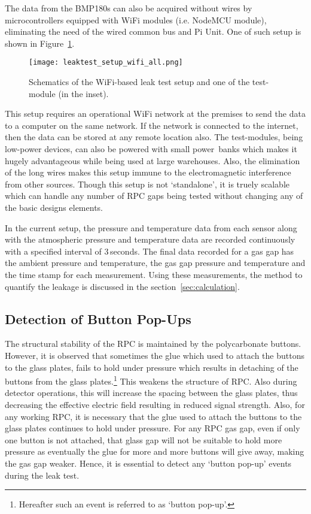 The data from the BMP180s can also be acquired without wires by microcontrollers equipped with WiFi modules (i.e. NodeMCU module\cite{nodemcu2015}), eliminating the need of the wired common bus and Pi Unit. One of such setup is shown in Figure~\ref{fig:leakwifi}. 
\begin{figure}
  \centering
  \texttt{[image: leaktest\_setup\_wifi\_all.png]}
  \caption{Schematics of the WiFi-based leak test setup and one of the test-module (in the inset).}
  \label{fig:leakwifi}
\end{figure}
This setup requires an operational WiFi network at the premises to send the data to a computer on the same network. If the network is connected to the internet, then the data can be stored at any remote location also. The test-modules, being low-power devices, can also be powered with small power~banks which makes it hugely advantageous while being used at large warehouses. Also, the elimination of the long wires makes this setup immune to the electromagnetic interference from other sources. Though this setup is not `standalone', it is truely scalable which can handle any number of RPC gaps being tested without changing any of the basic designs elements.

In the current setup, the pressure and temperature data from each sensor along with the atmospheric pressure and temperature data are recorded continuously with a specified interval of $3$\,seconds. The final data recorded for a gas gap has the ambient pressure and temperature, the gas gap pressure and temperature and the time stamp for each measurement. Using these measurements, the method to quantify the leakage is discussed in the section~\ref{sec:calculation}.

\subsection{Detection of Button Pop-Ups}\label{sec:button}
The structural stability of the RPC is maintained by the polycarbonate buttons. However, it is observed that sometimes the glue which used to attach the buttons to the glass plates, fails to hold under pressure which results in detaching of the buttons from the glass plates.\footnote{Hereafter such an event is referred to as `button pop-up'.} This weakens the structure of RPC. Also during detector operations, this will increase the spacing between the glass plates, thus decreasing the effective electric field resulting in reduced signal strength. Also, for any working RPC, it is necessary that the glue used to attach the buttons to the glass plates continues to hold under pressure. For any RPC gas gap, even if only one button is not attached, that glass gap will not be suitable to hold more pressure as eventually the glue for more and more buttons will give away, making the gas gap weaker. Hence, it is essential to detect any `button pop-up' events during the leak test.

